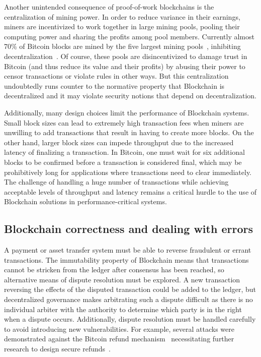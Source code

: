 Another unintended consequence of proof-of-work blockchains is the centralization of mining power.  In order to reduce variance in their earnings, miners are incentivized to work together in large mining pools, pooling their computing power and sharing the profits among pool members.  Currently almost 70\% of Bitcoin blocks are mined by the five largest mining pools~\cite{BlockchainInfoPools}, inhibiting decentralization~\cite{arxiv:GBERS18}. Of course, these pools are disincentivized to damage trust in Bitcoin (and thus reduce its value and their profits) by abusing their power to censor transactions or violate rules in other ways. But this centralization undoubtedly runs counter to the normative property that Blockchain is decentralized and it may violate security notions that depend on decentralization.  

Additionally, many design choices limit the performance of Blockchain systems.  Small block sizes can lead to extremely high transaction fees when miners are unwilling to add transactions that result in having to create more blocks.  On the other hand, larger block sizes can impede  throughput due to the increased latency of finalizing a transaction. In Bitcoin, one must wait for six additional blocks to be confirmed before a transaction is considered final, which may be prohibitively long for applications where transactions need to clear immediately. The challenge of handling a huge number of transactions while achieving acceptable levels of throughput and latency remains a critical hurdle to the use of Blockchain solutions in performance-critical systems.

\subsection{Blockchain correctness and dealing with errors}
A payment or asset transfer system must be able to reverse fraudulent or errant transactions. The immutability property of Blockchain means that transactions cannot be stricken from the ledger after consensus has been reached, so alternative means of dispute resolution must be explored. A new transaction reversing the effects of the disputed transaction could be added to the ledger, but decentralized governance makes arbitrating such a dispute difficult as there is no individual arbiter with the authority to determine which party is in the right when a dispute occurs.  Additionally, dispute resolution must be handled carefully to avoid introducing new vulnerabilities.  For example, several attacks were demonstrated against the Bitcoin refund mechanism~\cite{FC:MccShaHao16} necessitating further research to design secure refunds~\cite{arxiv:AviSafSha18}.

